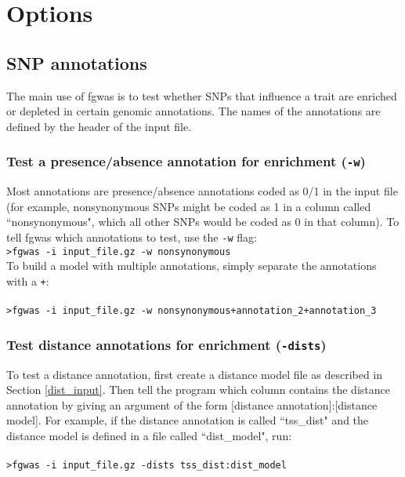 \documentclass[11pt,titlepage]{article}
\begin{document}
\section{Options}
\subsection{SNP annotations}
The main use of fgwas is to test whether SNPs that influence a trait are enriched or depleted in certain genomic annotations. The names of the annotations are defined by the header of the input file.
\subsubsection{Test a presence/absence annotation for enrichment (\texttt{-w})}
Most annotations are presence/absence annotations coded as 0/1 in the input file (for example, nonsynonymous SNPs might be coded as 1 in a column called ``nonsynonymous", which all other SNPs would be coded as 0 in that column). To tell fgwas which annotations to test, use the \texttt{-w} flag:\\

\noindent \texttt{>fgwas -i input\_file.gz -w nonsynonymous}\\

\noindent To build a model with multiple annotations, simply separate the annotations with a \texttt{+}:
\\
\\
\noindent \texttt{>fgwas -i input\_file.gz -w nonsynonymous+annotation\_2+annotation\_3}

\subsubsection{Test distance annotations for enrichment (\texttt{-dists})}
To test a distance annotation, first create a distance model file as described in Section \ref{dist_input}. Then tell the program which column contains the distance annotation by giving an argument of the form [distance annotation]:[distance model]. For example, if the distance annotation is called ``tss\_dist" and the distance model is defined in a file called ``dist\_model", run:\\
\\
\noindent \texttt{>fgwas -i input\_file.gz -dists tss\_dist:dist\_model}\\
\end{document}
